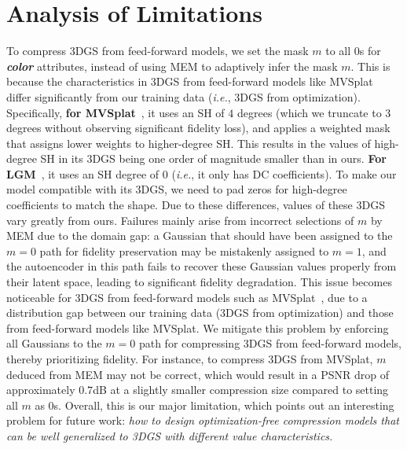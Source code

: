 \documentclass{article} %
\newcommand{\ie}{\textit{i.e.}}
\begin{document}
\section{Analysis of Limitations}
\label{sec:mask_all_0}
To compress 3DGS from feed-forward models, we set the mask $m$ to all $0$s for \textbf{\textit{color}} attributes, instead of using MEM to adaptively infer the mask $m$. This is because the characteristics in 3DGS from feed-forward models like MVSplat~\citep{MVSplat} differ significantly from our training data (\ie, 3DGS from optimization).
Specifically, \textbf{for MVSplat}~\citep{MVSplat,pixelsplat}, it uses an SH of $4$ degrees (which we truncate to $3$ degrees without observing significant fidelity loss), and applies a weighted mask that assigns lower weights to higher-degree SH. This results in the values of high-degree SH in its 3DGS being one order of magnitude smaller than in ours. \textbf{For LGM}~\citep{LGM}, it uses an SH degree of $0$ (\ie, it only has DC coefficients). To make our model compatible with its 3DGS, we need to pad zeros for high-degree coefficients to match the shape.
Due to these differences, values of these 3DGS vary greatly from ours. Failures mainly arise from incorrect selections of $m$ by MEM due to the domain gap: a Gaussian that should have been assigned to the $m=0$ path for fidelity preservation may be mistakenly assigned to $m=1$, and the autoencoder in this path fails to recover these Gaussian values properly from their latent space, leading to significant fidelity degradation. This issue becomes noticeable for 3DGS from feed-forward models such as MVSplat~\citep{MVSplat}, due to a distribution gap between our training data (3DGS from optimization) and those from feed-forward models like MVSplat. We mitigate this problem by enforcing all Gaussians to the $m=0$ path for compressing 3DGS from feed-forward models, thereby prioritizing fidelity. For instance, to compress 3DGS from MVSplat, $m$ deduced from MEM may not be correct, which would result in a PSNR drop of approximately $0.7$dB at a slightly smaller compression size compared to setting all $m$ as $0$s. Overall, this is our major limitation, which points out an interesting problem for future work: \textit{how to design optimization-free compression models that can be well generalized to 3DGS with different value characteristics.}
\end{document}
